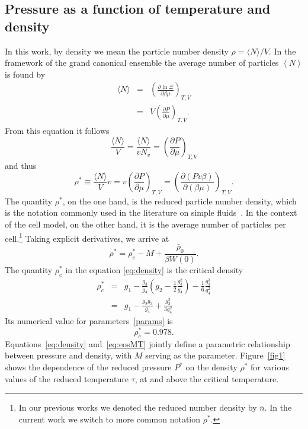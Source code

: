 \documentclass[fleqn,twoside,twocolumn,nofootinbib,showkeys]{revtex4} %
\begin{document}
	
	\subsection{Pressure as a function of temperature and density}
	In this work, by density we mean the particle number density $\rho = \langle N \rangle / V$.
	In the framework of the grand canonical ensemble the average number of particles $\left\langle N \right\rangle$ is found by 
	\begin{eqnarray*}
		\langle N \rangle & = & \left(\frac{\partial \ln\Xi}{\partial \beta \mu}\right)_{T,V} 
		\\
		& = & V \left(\frac{\partial P}{\partial \mu}\right)_{T,V}.
	\end{eqnarray*}
	From this equation it follows
	\begin{equation*}
		\frac{\langle N \rangle}{V} = \frac{\langle N \rangle}{v N_v} = \left(\frac{\partial P}{\partial \mu}\right)_{T,V}
	\end{equation*}
	and thus
	\begin{equation}
		\rho^* \equiv \frac{\langle N \rangle}{V} v = v \left(\frac{\partial P}{\partial \mu}\right)_{T,V} 
		= \left(\frac{\partial (Pv\beta)}{\partial (\beta \mu)}\right)_{T,V}.
	\end{equation}
	The quantity $\rho^*$, on the one hand, is the reduced particle number density, which is the notation commonly used in the literature on simple fluids~\cite{HansenMcDonald2013}. In the context of the cell model, on the other hand, it is the average number of particles per cell.\footnote{In our previous works we denoted the reduced number density by $\bar{n}$. In the current work we switch to more common notation $\rho^*$.}
	Taking explicit derivatives, we arrive at
	\begin{equation}\label{eq:density}
		\rho^* = \rho^*_c - M + \frac{ \bar \rho_0}{\beta W(0)}.
	\end{equation}
	The quantity $\rho^*_c$ in the equation \eqref{eq:density} is the critical density~\cite{KozlovskiiDobush2020}
	\begin{eqnarray}\label{eq:crit_dens}
		\rho^*_c & = & g_1 - \frac{g_3}{g_4}\left(  g_2 - \frac{1}{2} \frac{g_3^2}{g_4}\right) - \frac{1}{6} \frac{g_3^3}{g_4^2} 
		\nonumber\\
		& = & g_1 - \frac{g_2 g_3}{g_4} + \frac{g_3^3}{3g_4^2}
	\end{eqnarray}
	Its numerical value for parameters~\eqref{params} is
	\begin{equation*}
		\rho^*_c = 0.978.
	\end{equation*}
	Equations~\eqref{eq:density} and~\eqref{eq:eosMT} jointly define a parametric relationship between pressure and density, with $M$ serving as the parameter. Figure~\ref{fig1} shows the dependence of the reduced pressure $P^*$ on the density $\rho^*$ for various values of the reduced temperature $\tau$, at and above the critical temperature.
	
\end{document}
